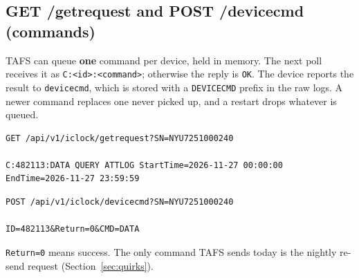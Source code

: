 \documentclass[11pt]{article}
\begin{document}
\subsection{GET /getrequest and POST /devicecmd (commands)}
TAFS can queue \textbf{one} command per device, held in memory. The next poll receives it as
\texttt{C:<id>:<command>}; otherwise the reply is \texttt{OK}. The device reports the result to \texttt{devicecmd},
which is stored with a \texttt{DEVICECMD} prefix in the raw logs. A newer command replaces one never picked up, and a
restart drops whatever is queued.
\begin{lstlisting}
GET /api/v1/iclock/getrequest?SN=NYU7251000240

C:482113:DATA QUERY ATTLOG StartTime=2026-11-27 00:00:00	EndTime=2026-11-27 23:59:59
\end{lstlisting}
\begin{lstlisting}
POST /api/v1/iclock/devicecmd?SN=NYU7251000240

ID=482113&Return=0&CMD=DATA
\end{lstlisting}
\texttt{Return=0} means success. The only command TAFS sends today is the nightly re-send request
(Section~\ref{sec:quirks}).

\end{document}
